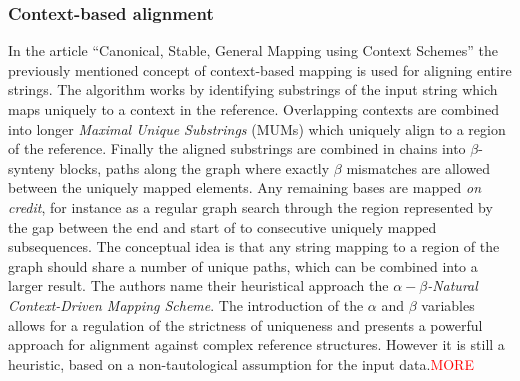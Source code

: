 \documentclass[thesis.tex]{subfiles}
\begin{document}
\subsubsection{Context-based alignment}
\label{sec:canonical}
In the article ``Canonical, Stable, General Mapping using Context Schemes''\cite{canonical_stable_general_mapping_using_context_schemes} the previously mentioned concept of context-based mapping is used for aligning entire strings. The algorithm works by identifying substrings of the input string which maps uniquely to a context in the reference. Overlapping contexts are combined into longer \textit{Maximal Unique Substrings} (MUMs) which uniquely align to a region of the reference. Finally the aligned substrings are combined in chains into $\beta$-synteny blocks, paths along the graph where exactly $\beta$ mismatches are allowed between the uniquely mapped elements. Any remaining bases are mapped \textit{on credit}, for instance as a regular graph search through the region represented by the gap between the end and start of to consecutive uniquely mapped subsequences. The conceptual idea is that any string mapping to a region of the graph should share a number of unique paths, which can be combined into a larger result. The authors name their heuristical approach the \textit{$\alpha-\beta$-Natural Context-Driven Mapping Scheme}. The introduction of the $\alpha$ and $\beta$ variables allows for a regulation of the strictness of uniqueness and presents a powerful approach for alignment against complex reference structures. However it is still a heuristic, based on a non-tautological assumption for the input data.\textcolor{red}{MORE}
\end{document}
